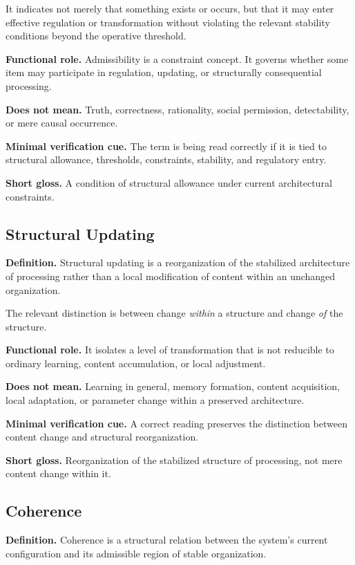 \documentclass[11pt,a4paper]{article}
\begin{document}
	It indicates not merely that something exists or occurs, but that it may enter effective regulation or transformation without violating the relevant stability conditions beyond the operative threshold.
	
	\textbf{Functional role.} Admissibility is a constraint concept. It governs whether some item may participate in regulation, updating, or structurally consequential processing.
	
	\textbf{Does not mean.} Truth, correctness, rationality, social permission, detectability, or mere causal occurrence.
	
	\textbf{Minimal verification cue.} The term is being read correctly if it is tied to structural allowance, thresholds, constraints, stability, and regulatory entry.
	
	\textbf{Short gloss.} A condition of structural allowance under current architectural constraints.
	
	\subsection{Structural Updating}
	
	\textbf{Definition.} Structural updating is a reorganization of the stabilized architecture of processing rather than a local modification of content within an unchanged organization.
	
	The relevant distinction is between change \emph{within} a structure and change \emph{of} the structure.
	
	\textbf{Functional role.} It isolates a level of transformation that is not reducible to ordinary learning, content accumulation, or local adjustment.
	
	\textbf{Does not mean.} Learning in general, memory formation, content acquisition, local adaptation, or parameter change within a preserved architecture.
	
	\textbf{Minimal verification cue.} A correct reading preserves the distinction between content change and structural reorganization.
	
	\textbf{Short gloss.} Reorganization of the stabilized structure of processing, not mere content change within it.
	
	\subsection{Coherence}
	
	\textbf{Definition.} Coherence is a structural relation between the system's current configuration and its admissible region of stable organization.
	
\end{document}
